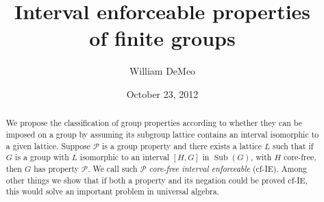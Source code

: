 \documentclass[11pt]{amsart}
\title[Interval enforceable properties of finite groups]{Interval enforceable properties\\ of finite groups}
\author{William DeMeo}
\date{October 23, 2012}
\theoremstyle{plain}
\theoremstyle{definition}
\theoremstyle{remark}
\numberwithin{theorem}{section}
\numberwithin{claim}{section}
\numberwithin{equation}{section}
\numberwithin{conjecture}{section}
\newcommand{\<}{\ensuremath{\langle}}
\renewcommand{\>}{\ensuremath{\rangle}}
\renewcommand{\leq}{\ensuremath{\leqslant}}
\newcommand{\Sub}{\ensuremath{\operatorname{Sub}}}
\newcommand{\0}{\ensuremath{\mathbf{0}}}
\newcommand{\1}{\ensuremath{\mathbf{1}}}
\newcommand{\2}{\ensuremath{\mathbf{2}}}
\newcommand{\3}{\ensuremath{\mathbf{3}}}
\newcommand{\4}{\ensuremath{\mathbf{4}}}
\newcommand{\5}{\ensuremath{\mathbf{5}}}
\newcommand{\cP}{\ensuremath{\mathcal{P}}}
\newcommand{\IE}{{\small IE}}
\begin{document}
\maketitle
\begin{abstract}

We propose the classification of group properties according to whether they can be
imposed on a group by assuming its subgroup lattice contains an interval
isomorphic to a given lattice.  Suppose $\cP$ is a group property and there exists a
lattice $L$ such that if $G$ is a group with $L$ isomorphic to an interval $[H,G]$ in
$\Sub(G)$, with $H$ core-free, then $G$ has property $\cP$.  We call such $\cP$ \emph{core-free
interval enforceable} (cf-IE). Among other things we show that if both a property
and its negation could be proved cf-IE, this would solve an important problem in
universal algebra. 



\end{abstract}
\end{document}
